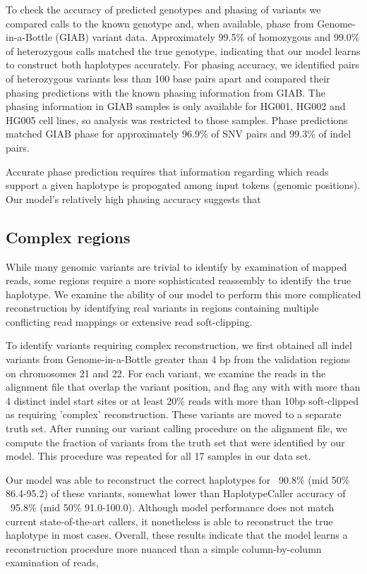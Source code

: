 \documentclass[]{article}
\begin{document}
To check the accuracy of predicted genotypes and phasing of variants we compared calls to the known genotype and, when available, phase from Genome-in-a-Bottle (GIAB) variant data. Approximately 99.5\% of homozygous  and 99.0\% of heterozygous calls matched the true genotype, indicating that our model learns to construct both haplotypes accurately.  For phasing accuracy, we identified pairs of heterozygous variants less than 100 base pairs apart and compared their phasing predictions with the known phasing information from GIAB. The phasing information in GIAB samples is only available for HG001, HG002 and HG005 cell lines, so analysis was restricted to those samples. Phase predictions matched GIAB phase for approximately 96.9\% of SNV pairs and 99.3\% of indel pairs.

Accurate phase prediction requires that information regarding which reads support a given haplotype is propogated among input tokens (genomic positions). Our model's relatively high phasing accuracy suggests that 


\subsection{Complex regions}
 While many genomic variants are trivial to identify by examination of mapped reads, some regions require a more sophisticated reassembly to identify the true haplotype. We examine the ability of our model to perform this more complicated reconstruction by identifying real variants in regions containing multiple conflicting read mappings or extensive read soft-clipping. 
 
 To identify variants requiring complex reconstruction, we first obtained all indel variants from Genome-in-a-Bottle greater than 4 bp from the validation regions on chromosomes 21 and 22. For each variant, we examine the reads in the alignment file that overlap the variant position, and flag any with with more than 4 distinct indel start sites or at least 20\% reads with more than 10bp soft-clipped as requiring 'complex' reconstruction. These variants are moved to a separate truth set. After running our variant calling procedure on the alignment file, we compute the fraction of variants from the truth set that were identified by our model. This procedure was repeated for all 17 samples in our data set. 

 Our model was able to reconstruct the correct haplotypes for ~90.8\% (mid 50\% 86.4-95.2) of these variants, somewhat lower than HaplotypeCaller accuracy of ~95.8\% (mid 50\% 91.0-100.0).  Although model performance does not match current state-of-the-art callers, it nonetheless is able to reconstruct the true haplotype in most cases. Overall, these results indicate that the model learns a reconstruction procedure more nuanced than a simple column-by-column examination of reads, 
\end{document}
